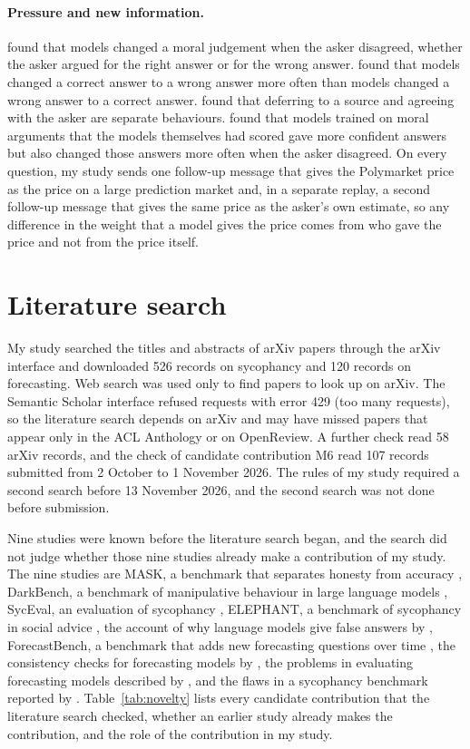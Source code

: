 \documentclass[11pt]{article}
\begin{document}
\paragraph{Pressure and new information.}
\citet{kim2026} found that models changed a moral judgement when the asker disagreed, whether the asker argued for the right answer or for the wrong answer. \citet{qu2026} found that models changed a correct answer to a wrong answer more often than models changed a wrong answer to a correct answer. \citet{kumar2026} found that deferring to a source and agreeing with the asker are separate behaviours. \citet{dekuthymeurers2026} found that models trained on moral arguments that the models themselves had scored gave more confident answers but also changed those answers more often when the asker disagreed. On every question, my study sends one follow-up message that gives the Polymarket price as the price on a large prediction market and, in a separate replay, a second follow-up message that gives the same price as the asker's own estimate, so any difference in the weight that a model gives the price comes from who gave the price and not from the price itself.

\section{Literature search}\label{app:novelty}

My study searched the titles and abstracts of arXiv papers through the arXiv interface and downloaded 526 records on sycophancy and 120 records on forecasting. Web search was used only to find papers to look up on arXiv. The Semantic Scholar interface refused requests with error 429 (too many requests), so the literature search depends on arXiv and may have missed papers that appear only in the ACL Anthology or on OpenReview. A further check read 58 arXiv records, and the check of candidate contribution M6 read 107 records submitted from 2 October to 1 November 2026. The rules of my study required a second search before 13 November 2026, and the second search was not done before submission.

Nine studies were known before the literature search began, and the search did not judge whether those nine studies already make a contribution of my study. The nine studies are MASK, a benchmark that separates honesty from accuracy \citep{ren2025mask}, DarkBench, a benchmark of manipulative behaviour in large language models \citep{kran2025darkbench}, SycEval, an evaluation of sycophancy \citep{fanous2025syceval}, ELEPHANT, a benchmark of sycophancy in social advice \citep{cheng2025elephant}, the account of why language models give false answers by \citet{kalai2025}, ForecastBench, a benchmark that adds new forecasting questions over time \citep{karger2025forecastbench}, the consistency checks for forecasting models by \citet{paleka2025consistency}, the problems in evaluating forecasting models described by \citet{paleka2025pitfalls}, and the flaws in a sycophancy benchmark reported by \citet{gupta2026}. Table~\ref{tab:novelty} lists every candidate contribution that the literature search checked, whether an earlier study already makes the contribution, and the role of the contribution in my study.
\end{document}
